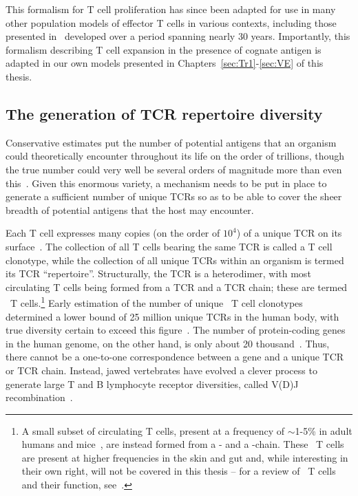 This formalism for T cell proliferation has since been adapted for use in many other population models of effector T cells in various contexts, including those presented in~\cite{de1998target,khadra2009role,khadra2011investigating,conway2015post,mayer2019regulation} developed over a period spanning nearly 30 years. Importantly, this formalism describing T cell expansion in the presence of cognate antigen is adapted in our own models presented in Chapters~\ref{sec:Tr1}-\ref{sec:VE} of this thesis.

\subsection{The generation of TCR repertoire diversity}
\label{sec:intro_overview_TCRdiversification}

Conservative estimates put the number of potential antigens that an organism could theoretically encounter throughout its life on the order of trillions, though the true number could very well be several orders of magnitude more than even this~\cite{mason1998very,yates2014theories}. Given this enormous variety, a mechanism needs to be put in place to generate a sufficient number of unique TCRs so as to be able to cover the sheer breadth of potential antigens that the host may encounter.

Each T cell expresses many copies (on the order of $10^4$) of a unique TCR on its surface~\cite{labrecque2001much}. The collection of all T cells bearing the same TCR is called a T cell clonotype, while the collection of all unique TCRs within an organism is termed its TCR ``repertoire''. Structurally, the TCR is a heterodimer, with most circulating T cells being formed from a TCR\textalpha{} and a TCR\textbeta{} chain; these are termed \textalpha{}\textbeta{}~T cells.\footnote{A small subset of circulating T cells, present at a frequency of $\sim$1-5\% in adult humans and mice~\cite{lanier1988structural,groh1989human}, are instead formed from a \textgamma{}- and a \textdelta{}-chain. These \textgamma{}\textdelta{}~T cells are present at higher frequencies in the skin and gut and, while interesting in their own right, will not be covered in this thesis -- for a review of \textgamma{}\textdelta{}~T cells and their function, see~\cite{vantourout2013six}.} Early estimation of the number of unique \textalpha{}\textbeta{}~T cell clonotypes determined a lower bound of 25 million unique TCRs in the human body, with true diversity certain to exceed this figure~\cite{arstila1999direct}. The number of protein-coding genes in the human genome, on the other hand, is only about 20 thousand~\cite{salzberg2018open,piovesan2019human}. Thus, there cannot be a one-to-one correspondence between a gene and a unique TCR\textalpha{} or TCR\textbeta{} chain. Instead, jawed vertebrates have evolved a clever process to generate large T and B lymphocyte receptor diversities, called V(D)J recombination~\cite{litman2010origins}.

